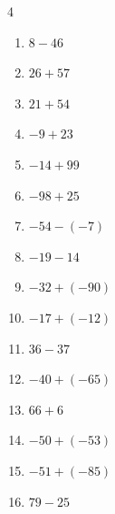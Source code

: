 \begin{multicols}{4}
\begin{enumerate}
        \phantom{$=-90$}

  \item $8-46$

        \phantom{$=-38$}

  \item $26+57$

        \phantom{$=83$}

  \item $21+54$

        \phantom{$=75$}

  \item $-9+23$

        \phantom{$=14$}

  \item $-14+99$

        \phantom{$=85$}

  \item $-98+25$

        \phantom{$=-73$}

  \item $-54-(-7)$

        \phantom{$=-47$}

  \item $-19-14$

        \phantom{$=-33$}

  \item $-32+(-90)$

        \phantom{$=-122$}

  \item $-17+(-12)$

        \phantom{$=-29$}

  \item $36-37$

        \phantom{$=-1$}

  \item $-40+(-65)$

        \phantom{$=-105$}

  \item $66+6$

        \phantom{$=72$}

  \item $-50+(-53)$

        \phantom{$=-103$}

  \item $-51+(-85)$

        \phantom{$=-136$}

  \item $79-25$


\end{enumerate}
\end{multicols}
